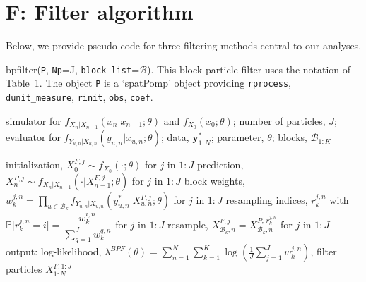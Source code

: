 \documentclass{article}
\begin{document}
\section{F: Filter algorithm}

Below, we provide pseudo-code for three filtering methods central to our analyses. 

\begin{algorithm}[H]
\caption{bpfilter(\texttt{P}, \texttt{Np}=J, \texttt{block\_list}=$\mathcal{B}$). This block particle filter uses the notation of Table~1. The object \texttt{P} is a ‘spatPomp’ object providing \texttt{rprocess}, \texttt{dunit\_measure}, \texttt{rinit}, \texttt{obs}, \texttt{coef}.}
\begin{algorithmic}[1]
\REQUIRE simulator for $f_{X_n|X_{n-1}}(x_n | x_{n-1}; \theta)$ and $f_{X_0}(x_0; \theta)$; number of particles, $J$; evaluator for $f_{Y_{u,n}|X_{u,n}}(y_{u,n} | x_{u,n}; \theta)$; data, $\mathbf{y}_{1:N}^*$; parameter, $\theta$; blocks, $\mathcal{B}_{1:K}$

\STATE initialization, $X_0^{F,j} \sim f_{X_0}(\cdot; \theta)$ for $j$ in $1:J$
    \STATE prediction, $X_n^{P,j} \sim f_{X_n|X_{n-1}}(\cdot | X_{n-1}^{F,j}; \theta)$ for $j$ in $1:J$
        \STATE block weights, $w_k^{j,n} = \prod_{u \in \mathcal{B}_k} f_{Y_{u,n}|X_{u,n}}(y_{u,n}^* | X_{u,n}^{P,j}; \theta)$ for $j$ in $1:J$
        \STATE resampling indices, $r_k^{j,n}$ with $\mathbb{P}\bigl[r_k^{j,n} = i\bigr] = \dfrac{w_k^{i,n}}{\sum_{q=1}^J w_k^{q,n}}$ for $j$ in $1:J$
        \STATE resample, $X_{\mathcal{B}_k,n}^{F,j} = X_{\mathcal{B}_k,n}^{P,\,r_k^{j,n}}$ for $j$ in $1:J$
    \ENDFOR
\ENDFOR
\ENSURE output: log-likelihood, $\lambda^{BPF}(\theta) = \sum_{n=1}^N \sum_{k=1}^K \log\left(\tfrac{1}{J} \sum_{j=1}^J w_k^{j,n}\right)$, filter particles $X_{1:N}^{F,1:J}$
\end{algorithmic}
\end{algorithm}
\end{document}
